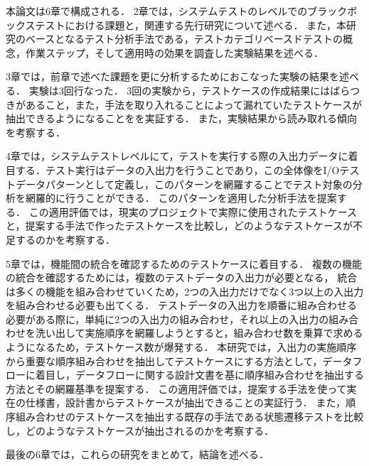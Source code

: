 本論文は6章で構成される．
2章では，システムテストのレベルでのブラックボックステストにおける課題と，関連する先行研究について述べる．
また，本研究のベースとなるテスト分析手法である，テストカテゴリベースドテストの概念，作業ステップ，そして適用時の効果を調査した実験結果を述べる．

3章では，前章で述べた課題を更に分析するためにおこなった実験の結果を述べる．
実験は3回行なった．
3回の実験から，テストケースの作成結果にはばらつきがあること，また，手法を取り入れることによって漏れていたテストケースが抽出できるようになることをを実証する．
また，実験結果から読み取れる傾向を考察する．

4章では，システムテストレベルにて，テストを実行する際の入出力データに着目する．テスト実行はデータの入出力を行うことであり，この全体像をI/Oテストデータパターンとして定義し，このパターンを網羅することでテスト対象の分析を網羅的に行うことができる．
このパターンを適用した分析手法を提案する．
この適用評価では，現実のプロジェクトで実際に使用されたテストケースと，提案する手法で作ったテストケースを比較し，どのようなテストケースが不足するのかを考察する．

5章では，機能間の統合を確認するためのテストケースに着目する．
複数の機能の統合を確認するためには，複数のテストデータの入出力が必要となる，
統合は多くの機能を組み合わせていくため，2つの入出力だけでなく3つ以上の入出力を組み合わせる必要も出てくる．
テストデータの入出力を順番に組み合わせる必要がある際に，単純に2つの入出力の組み合わせ，それ以上の入出力の組み合わせを洗い出して実施順序を網羅しようとすると，組み合わせ数を乗算で求めるようになるため，テストケース数が爆発する．
本研究では，入出力の実施順序から重要な順序組み合わせを抽出してテストケースにする方法として，データフローに着目し，データフローに関する設計文書を基に順序組み合わせを抽出する方法とその網羅基準を提案する．
この適用評価では，提案する手法を使って実在の仕様書，設計書からテストケースが抽出できることの実証行う．
また，順序組み合わせのテストケースを抽出する既存の手法である状態遷移テストを比較し，どのようなテストケースが抽出されるのかを考察する．

最後の6章では，これらの研究をまとめて，結論を述べる．
